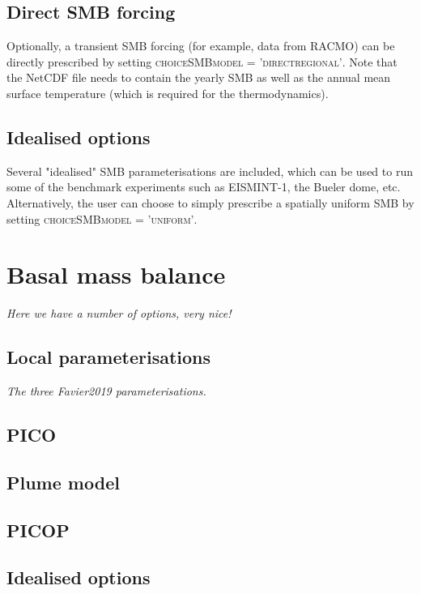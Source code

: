 \documentclass{article}
\begin{document}
\subsection{Direct SMB forcing}

Optionally, a transient SMB forcing (for example, data from RACMO) can be directly prescribed by setting \textsc{choice\textunderscore SMB\textunderscore model = 'direct\textunderscore regional'}. Note that the NetCDF file needs to contain the yearly SMB as well as the annual mean surface temperature (which is required for the thermodynamics).

\subsection{Idealised options}

Several "idealised" SMB parameterisations are included, which can be used to run some of the benchmark experiments such as EISMINT-1, the Bueler dome, etc. Alternatively, the user can choose to simply prescribe a spatially uniform SMB by setting \textsc{choice\textunderscore SMB\textunderscore model = 'uniform'}.

\newpage
\section{Basal mass balance}

\textit{Here we have a number of options, very nice!}

\subsection{Local parameterisations}

\textit{The three Favier2019 parameterisations.}

\subsection{PICO}

\subsection{Plume model}

\subsection{PICOP}

\subsection{Idealised options}
\end{document}
